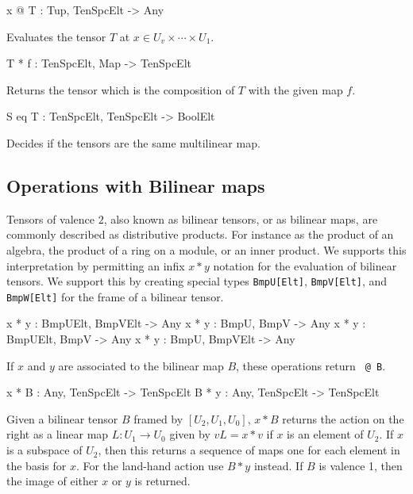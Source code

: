 \begin{intrinsics}
x @ T : Tup, TenSpcElt -> Any
\end{intrinsics}

Evaluates the tensor $T$ at $x\in U_v\times \cdots \times U_1$.

\begin{intrinsics}
T * f : TenSpcElt, Map -> TenSpcElt
\end{intrinsics}

Returns the tensor which is the composition of $T$ with the given map $f$.

\begin{intrinsics}
S eq T : TenSpcElt, TenSpcElt -> BoolElt
\end{intrinsics}

Decides if the tensors are the same multilinear map.

\subsection{Operations with Bilinear maps}
Tensors of valence $2$, also known as bilinear tensors, or
as bilinear maps,  are commonly described as distributive products.
For instance as the product of an algebra, the product of a ring on 
a module, or an inner product.  We supports this interpretation 
by permitting an infix $x*y$ notation for the evaluation of bilinear
tensors.  We support this by creating special types 
{\tt BmpU[Elt]}, {\tt BmpV[Elt]}, and {\tt BmpW[Elt]} for the frame
of a bilinear tensor.


\begin{intrinsics}
x * y : BmpUElt, BmpVElt -> Any
x * y : BmpU, BmpV -> Any
x * y : BmpUElt, BmpV -> Any
x * y : BmpU, BmpVElt -> Any
\end{intrinsics}

If $x$ and $y$ are associated to the bilinear map $B$, these operations return 
{\tt <x,y> @ B}.

\begin{intrinsics}
x * B : Any, TenSpcElt -> TenSpcElt
B * y : Any, TenSpcElt -> TenSpcElt
\end{intrinsics}

Given a bilinear tensor $B$ framed by $[U_2,U_1,U_0]$,
$x*B$ returns the action on the right as a 
linear map $L : U_1\rightarrow U_0$ given 
by $vL = x* v$ if $x$ is an element of $U_2$. 
If $x$ is a subspace of $U_2$, then this returns a sequence of 
maps one for each element in the basis for $x$.
For the land-hand action use $B*y$ instead.
If $B$ is valence 1, then the image of either $x$ or $y$ is returned.

